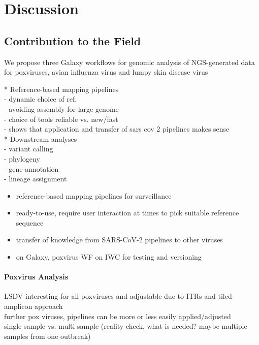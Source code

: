 \chapter{Discussion}\label{chap:discussion}
\todoit

\section{Contribution to the Field}
\todoit
We propose three Galaxy workflows for genomic analysis of NGS-generated data for poxviruses, avian influenza virus and lumpy skin disease virus

* Reference-based mapping pipelines\\
- dynamic choice of ref. \\
- avoiding assembly for large genome \\
- choice of tools reliable vs. new/fast \\
- shows that application and transfer of sars cov 2 pipelines makes sense \\
* Downstream analyses\\
- variant calling\\
- phylogeny\\
- gene annotation\\
- lineage assignment\\

\begin{itemize}
    \item reference-based mapping pipelines for surveillance
    \item ready-to-use, require user interaction at times to pick suitable reference sequence
    \item transfer of knowledge from SARS-CoV-2 pipelines to other viruses
    \item on Galaxy, poxvirus WF on IWC for testing and versioning
\end{itemize}

\subsubsection*{Poxvirus Analysis}
\ac{LSDV} interesting for all poxviruses and adjustable due to \acp{ITR} and tiled-amplicon approach \\
further pox viruses, pipelines can be more or less easily applied/adjusted \\
single sample vs. multi sample (reality check, what is needed? maybe multiple samples from one outbreak)


